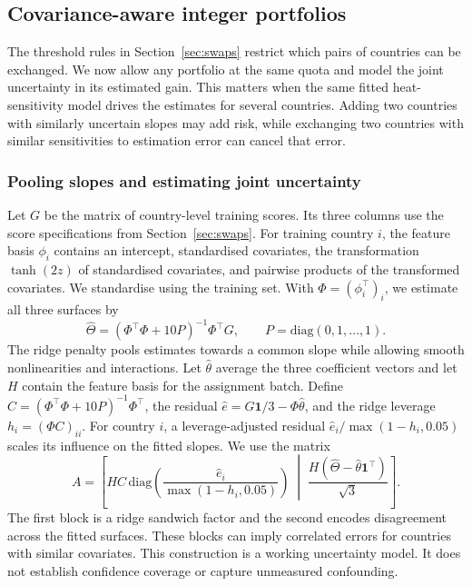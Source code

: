 \subsection{Covariance-aware integer portfolios}
\label{sec:ellipsoid}

The threshold rules in Section~\ref{sec:swaps} restrict which pairs of countries
can be exchanged. We now allow any portfolio at the same quota and model the joint
uncertainty in its estimated gain. This matters when the same fitted heat-sensitivity
model drives the estimates for several countries. Adding two countries with similarly
uncertain slopes may add risk, while exchanging two countries with similar
sensitivities to estimation error can cancel that error.

\subsubsection{Pooling slopes and estimating joint uncertainty}

Let $G$ be the matrix of country-level training scores. Its three columns use
the score specifications from Section~\ref{sec:swaps}. For training country $i$,
the feature basis $\phi_i$ contains an intercept, standardised covariates,
the transformation $\tanh(2z)$ of standardised covariates, and pairwise products
of the transformed covariates. We standardise using the training set. With
$\Phi=(\phi_i^\top)_i$, we estimate all three surfaces by
\[
 \widehat\Theta=(\Phi^\top\Phi+10P)^{-1}\Phi^\top G,
 \qquad P=\mathrm{diag}(0,1,\ldots,1).
\]
The ridge penalty pools estimates towards a common slope while allowing
smooth nonlinearities and interactions. Let $\widehat\theta$ average the
three coefficient vectors and let $H$ contain the feature basis for the
assignment batch. Define $C=(\Phi^\top\Phi+10P)^{-1}\Phi^\top$, the residual
$\widehat e=G\mathbf{1}/3-\Phi\widehat\theta$, and the ridge leverage
$h_i=(\Phi C)_{ii}$. For country $i$, a leverage-adjusted residual
$\widehat e_i/\max(1-h_i,0.05)$ scales its influence on the fitted slopes.
We use the matrix
\[
 A=\left[
   HC\,\mathrm{diag}\!\left(\frac{\widehat e_i}{\max(1-h_i,0.05)}\right)
   \;\middle|\;
   \frac{H(\widehat\Theta-\widehat\theta\mathbf{1}^\top)}{\sqrt{3}}
   \right].
\]
The first block is a ridge sandwich factor and the second encodes
disagreement across the fitted surfaces. These blocks can imply correlated
errors for countries with similar covariates. This construction is a working
uncertainty model. It does not establish confidence coverage or capture
unmeasured confounding.

